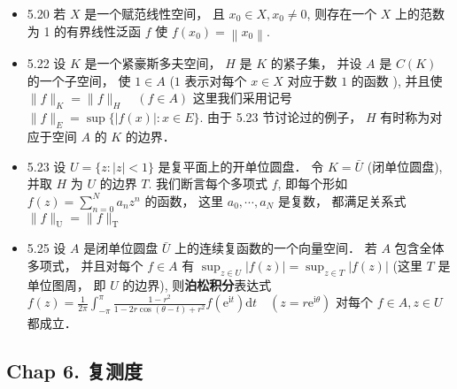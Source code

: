 \begin{itemize}
\item 5.20 若 $X$ 是一个赋范线性空间， 且 $x_{0} \in X, x_{0} \neq 0$, 则存在一个 $X$ 上的范数为 1 的有界线性泛函 $f$ 使 $f\left(x_{0}\right)=\left\|x_{0}\right\|$.

\item 5.22 设 $K$ 是一个紧豪斯多夫空间， $H$ 是 $K$ 的紧子集， 并设 $A$ 是 $C(K)$ 的一个子空间， 使 $1 \in A$ ($1$ 表示对每个 $x \in X$ 对应于数 $1$ 的函数 ), 并且使 $\|f\|_{K}=\|f\|_{H} \quad(f \in A)$ 这里我们采用记号 $\|f\|_{E}=\sup \{|f(x)|: x \in E\}$. 由于 5.23 节讨论过的例子， $H$ 有时称为对应于空间 $A$ 的 $K$ 的边界．

\item 5.23 设 $U=\{z:|z|<1\}$ 是复平面上的开单位圆盘． 令 $K=\bar{U}$ (闭单位圆盘), 并取 $H$ 为 $U$ 的边界 $T$. 我们断言每个多项式 $f$, 即每个形如 $f(z)=\sum_{n=0}^{N} a_{n} z^{n}$ 的函数， 这里 $a_{0}, \cdots, a_{N}$ 是复数， 都满足关系式 $\|f\|_{\mathrm{U}}=\|f\|_{\mathrm{T}}$

\item 5.25 设 $A$ 是闭单位圆盘 $\bar{U}$ 上的连续复函数的一个向量空间． 若 $A$ 包含全体多项式， 并且对每个 $f \in A$ 有 $\sup_{z \in U}|f(z)|=\sup _{z \in T} |f(z)|$ (这里 $T$ 是单位图周， 即 $U$ 的边界), 则\textbf{泊松积分}表达式 $f(z)=\frac{1}{2 \pi} \int_{-\pi}^{\pi} \frac{1-r^{2}}{1-2 r \cos (\theta-t)+r^{2}} f\left(\mathrm{e}^{\mathrm{i} t}\right) \mathrm{d} t \quad\left(z=r \mathrm{e}^{\mathrm{i} \theta}\right)$ 对每个 $f \in A, z \in U$ 都成立．

\end{itemize}


\subsection{Chap 6. 复测度}

